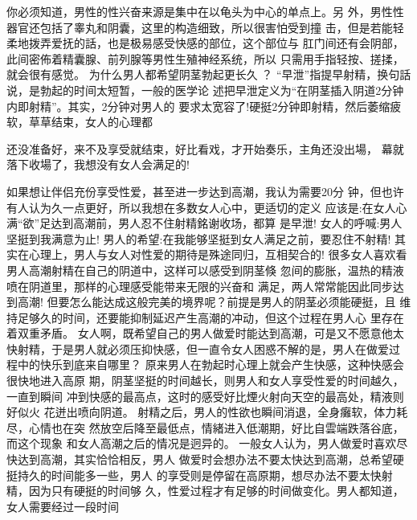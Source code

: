 \documentclass[12pt,UTF8]{ctexbook}
\begin{document}
你必须知道，男性的性兴奋来源是集中在以龟头为中心的单点上。另
外，男性性器官还包括了睾丸和阴囊，这里的构造细致，所以很害怕受到撞
击，但是若能轻柔地拨弄爱抚的話，也是极易感受快感的部位，这个部位与
肛门间还有会阴部，此间密佈着精囊腺、前列腺等男性生殖神经系统，所以
只需用手指轻按、搓揉，就会很有感觉。
为什么男人都希望阴茎勃起更长久 ？
“早泄”指提早射精，换句話说，是勃起的时间太短暂，一般的医学论
述把早泄定义为“在阴茎插入阴道2分钟内即射精”。其实，2分钟对男人的
要求太宽容了!硬挺2分钟即射精，然后萎缩疲软，草草结束，女人的心理都

还没准备好，来不及享受就结束，好比看戏，才开始奏乐，主角还没出場，
幕就落下收場了，我想没有女人会满足的!

如果想让伴侣充份享受性爱，甚至进一步达到高潮，我认为需要20分
钟，但也许有人认为久一点更好，所以我想在多数女人心中，更适切的定义
应该是:在女人心满“欲”足达到高潮前，男人忍不住射精銘谢收场，都算
是早泄!
女人的呼喊:男人坚挺到我满意为止!
男人的希望:在我能够坚挺到女人满足之前，要忍住不射精!
其实在心理上，男人与女人对性爱的期待是殊途同归，互相契合的!
很多女人喜欢看男人高潮射精在自己的阴道中，这样可以感受到阴茎倏
忽间的膨胀，温热的精液喷在阴道里，那样的心理感受能带来无限的兴奋和
满足，两人常常能因此同步达到高潮!
但要怎么能达成这般完美的境界呢？前提是男人的阴茎必须能硬挺，且
维持足够久的时间，还要能抑制延迟产生高潮的冲动，但这个过程在男人心
里存在着双重矛盾。
女人啊，既希望自己的男人做爱时能达到高潮，可是又不愿意他太快射精，于是男人就必须压抑快感，但一直令女人困惑不解的是，男人在做爱过
程中的快乐到底来自哪里？
原来男人在勃起时心理上就会产生快感，这种快感会很快地进入高原
期，阴茎坚挺的时间越长，则男人和女人享受性爱的时间越久，一直到瞬间
冲到快感的最高点，这时的感受好比煙火射向天空的最高处，精液则好似火
花迸出喷向阴道。
射精之后，男人的性欲也瞬间消退，全身癱软，体力耗尽，心情也在突
然放空后降至最低点，情緒进入低潮期，好比自雲端跌落谷底，而这个现象
和女人高潮之后的情况是迥异的。
一般女人认为，男人做爱时喜欢尽快达到高潮，其实恰恰相反，男人
做爱时会想办法不要太快达到高潮，总希望硬挺持久的时间能多一些，男人
的享受则是停留在高原期，想尽办法不要太快射精，因为只有硬挺的时间够
久，性爱过程才有足够的时间做变化。男人都知道，女人需要经过一段时间
\end{document}
